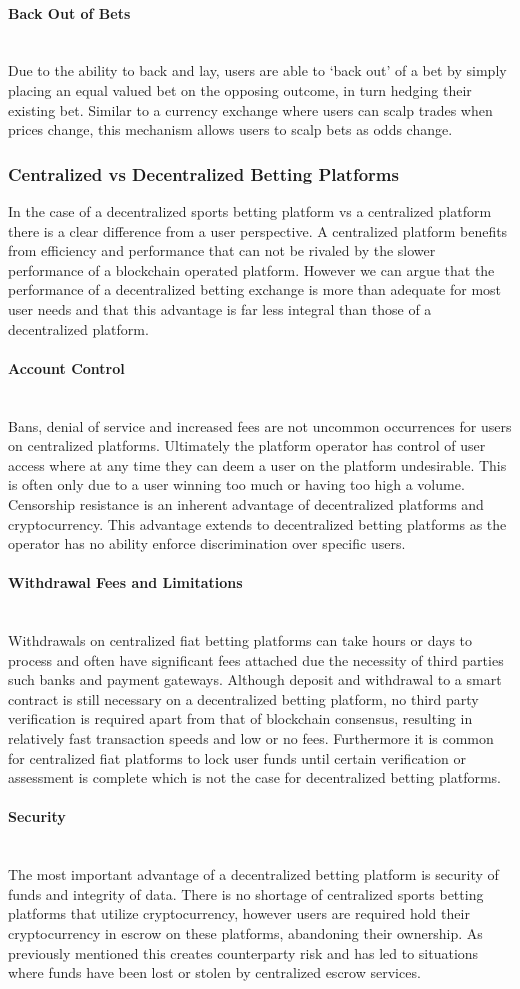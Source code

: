 \documentclass{article}
\newcommand{\myparagraph}[1]{\paragraph{#1}\mbox{}\\ \newline}
\begin{document}
				\myparagraph{Back Out of Bets}		
Due to the ability to back and lay, users are able to ‘back out’ of a bet by simply placing an equal valued bet on the opposing outcome, in turn hedging their existing bet. Similar to a currency exchange where users can scalp trades when prices change, this mechanism allows users to scalp bets as odds change.

			\subsubsection{Centralized vs Decentralized Betting Platforms}
In the case of a decentralized sports betting platform vs a centralized platform there is a clear difference from a user perspective. A centralized platform benefits from efficiency and performance that can not be rivaled by the slower performance of a blockchain operated platform. However we can argue that the performance of a decentralized betting exchange is more than adequate for most user needs and that this advantage is far less integral than those of a decentralized platform.

				\myparagraph{Account Control}					
Bans, denial of service and increased fees are not uncommon occurrences for users on centralized platforms. Ultimately the platform operator has control of user access where at any time they can deem a user on the platform undesirable. This is often only due to a user winning too much or having too high a volume. Censorship resistance is an inherent advantage of decentralized platforms and cryptocurrency. This advantage extends to decentralized betting platforms as the operator has no ability enforce discrimination over specific users.

				\myparagraph{Withdrawal Fees and Limitations}			
Withdrawals on centralized fiat betting platforms can take hours or days to process and often have significant fees attached due the necessity of third parties such banks and payment gateways. Although deposit and withdrawal to a smart contract is still necessary on a decentralized betting platform, no third party verification is required apart from that of blockchain consensus, resulting in relatively fast transaction speeds and low or no fees. Furthermore it is common for centralized fiat platforms to lock user funds until certain verification or assessment is complete which is not the case for decentralized betting platforms. 

				\myparagraph{Security}		
The most important advantage of a decentralized betting platform is security of funds and integrity of data. There is no shortage of centralized sports betting platforms that utilize cryptocurrency, however users are required hold their cryptocurrency in escrow on these platforms, abandoning their ownership. As previously mentioned this creates counterparty risk and has led to situations where funds have been lost or stolen by centralized escrow services.		
	
\end{document}

